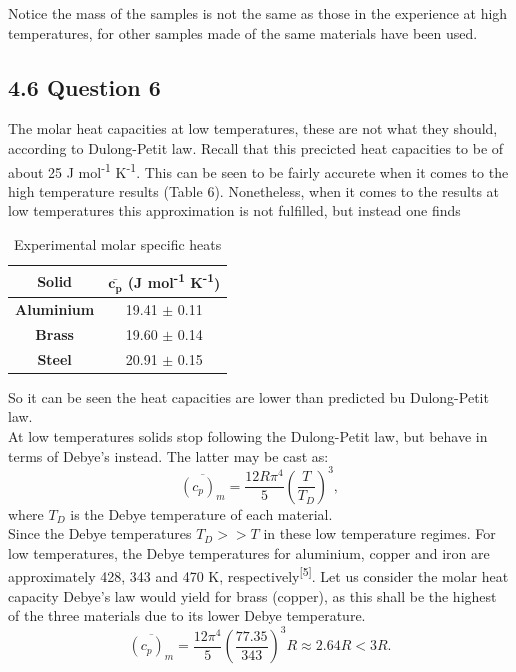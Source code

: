 \documentclass[a4paper, 12pt]{article}
\begin{document}
	 Notice the mass of the samples is not the same as those in the experience at high temperatures, for other samples made of the same materials have been used. 
	 \subsection{4.6 Question 6}
	 
	 The molar heat capacities at low temperatures, these are not what they should, according to Dulong-Petit law. Recall that this precicted heat capacities to be of about 25 J mol\textsuperscript{-1} K\textsuperscript{-1}. This can be seen to be fairly accurete when it comes to the high temperature results (Table 6). Nonetheless, when it comes to the results at low temperatures this approximation is not fulfilled, but instead one finds\\
	 \begin{table}[h!]
	 	\centering
	 	\caption{Experimental molar specific heats}
	 	\begin{tabular}{|c|c|}
	 		\hline
	 		\textbf{Solid} & $\boldsymbol{\bar{c_p}}$ \textbf{(J mol\textsuperscript{-1} K\textsuperscript{-1}})\\
	 		\hline
	 		\textbf{Aluminium} & 19.41 $\pm$ 0.11 \\
	 		\textbf{Brass} & 19.60 $\pm$ 0.14\\
	 		\textbf{Steel} & 20.91 $\pm$ 0.15\\
	 		\hline
	 	\end{tabular}
	 	
	 \end{table}
	 
	 So it can be seen the heat capacities are lower than predicted bu Dulong-Petit law.\\
	 
	 At low temperatures solids stop following the Dulong-Petit law, but behave in terms of Debye's instead. The latter may be cast as:
	 \begin{equation}\label{Debyelaw}
	 	\overline{(c_p)_m} = \frac{12R\pi^4}{5} \left(\frac{T}{T_D}\right)^3,
	 \end{equation}
	 where $T_D$ is the Debye temperature of each material.\\
	
	Since the Debye temperatures $T_D >> T$ in these low temperature regimes. For low temperatures, the Debye temperatures for aluminium, copper and iron are approximately 428, 343 and 470 K, respectively\textsuperscript{[5]}. Let us consider the molar heat capacity Debye's law would yield for brass (copper), as this shall be the highest of the three materials due to its lower Debye temperature.\\
	\begin{equation}\label{approx}
		\overline{(c_p)_m} = \frac{12 \pi^4}{5}\left(\frac{77.35}{343}\right)^3 R \approx 2.64 R < 3R.
	\end{equation}
\end{document}
